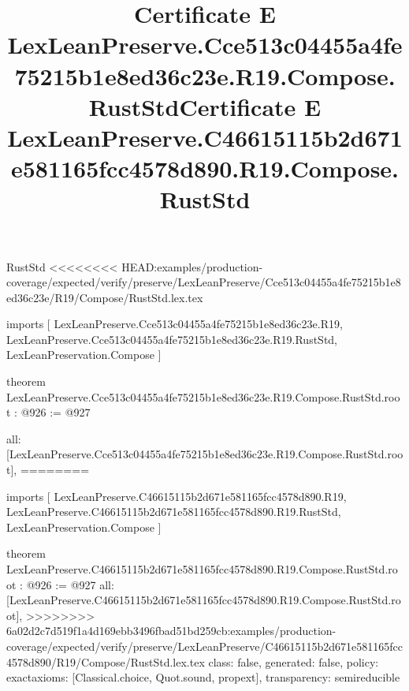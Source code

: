 \begin{lexlean}{RustStd}
<<<<<<<< HEAD:examples/production-coverage/expected/verify/preserve/LexLeanPreserve/Cce513c04455a4fe75215b1e8ed36c23e/R19/Compose/RustStd.lex.tex
\title{Certificate E LexLeanPreserve.Cce513c04455a4fe75215b1e8ed36c23e.R19.Compose.RustStd}
\begin{coremodule}
imports [
  LexLeanPreserve.Cce513c04455a4fe75215b1e8ed36c23e.R19,
  LexLeanPreserve.Cce513c04455a4fe75215b1e8ed36c23e.R19.RustStd,
  LexLeanPreservation.Compose
]

theorem LexLeanPreserve.Cce513c04455a4fe75215b1e8ed36c23e.R19.Compose.RustStd.root : @926 := @927 {
  all: [LexLeanPreserve.Cce513c04455a4fe75215b1e8ed36c23e.R19.Compose.RustStd.root],
========
\title{Certificate E LexLeanPreserve.C46615115b2d671e581165fcc4578d890.R19.Compose.RustStd}
\begin{coremodule}
imports [
  LexLeanPreserve.C46615115b2d671e581165fcc4578d890.R19,
  LexLeanPreserve.C46615115b2d671e581165fcc4578d890.R19.RustStd,
  LexLeanPreservation.Compose
]

theorem LexLeanPreserve.C46615115b2d671e581165fcc4578d890.R19.Compose.RustStd.root : @926 := @927 {
  all: [LexLeanPreserve.C46615115b2d671e581165fcc4578d890.R19.Compose.RustStd.root],
>>>>>>>> 6a02d2c7d519f1a4d169ebb3496fbad51bd259cb:examples/production-coverage/expected/verify/preserve/LexLeanPreserve/C46615115b2d671e581165fcc4578d890/R19/Compose/RustStd.lex.tex
  class: false,
  generated: false,
  policy: exact{axioms: [Classical.choice, Quot.sound, propext]},
  transparency: semireducible
}


\end{coremodule}}
\end{coremodule}
\end{lexlean}
